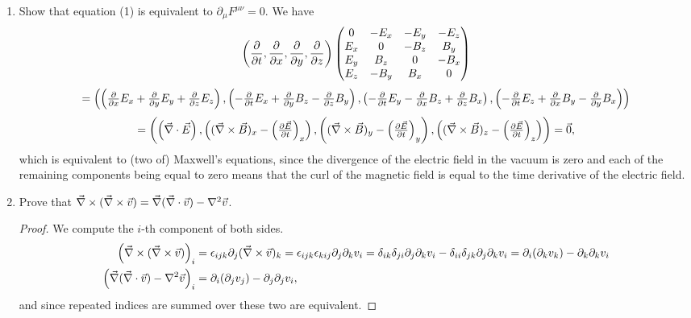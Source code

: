 \documentclass[11pt]{article}
\newcommand{\br}[1]{\left(#1\right)}
\begin{document}
\begin{enumerate}%
    \item Show that equation (1) is equivalent to $\partial_{\mu}F^{\mu\nu} = 0$. We have \[\br{\pdv{t},\pdv{x}, \pdv{y}, \pdv{z}}\begin{pmatrix}
      0 & -E_x & -E_y & -E_z \\
      E_x & 0 & -B_z & B_y \\
      E_y & B_z & 0 & -B_x \\
      E_z & -B_y & B_x & 0 
    \end{pmatrix}\]
    \[ = \begin{pmatrix}
      \br{\pdv{x}E_x + \pdv{y}E_y + \pdv{z}E_z} ,
      \br{-\pdv{t}E_x + \pdv{y}B_z - \pdv{z}B_y} ,
      \br{-\pdv{t}E_y - \pdv{x}B_z + \pdv{z}B_x} ,
      \br{-\pdv{t}E_z + \pdv{x}B_y - \pdv{y}B_x} 
    \end{pmatrix}\]
    \[= \begin{pmatrix}
      \br{\vec{\nabla}\cdot\vec{E}} ,
      \br{(\vec{\nabla}\times\vec{B})_x - \br{\pdv{\vec{E}}{t}}_x} ,
      \br{(\vec{\nabla}\times\vec{B})_y - \br{\pdv{\vec{E}}{t}}_y} ,
      \br{(\vec{\nabla}\times\vec{B})_z - \br{\pdv{\vec{E}}{t}}_z}
    \end{pmatrix} = \vec{0},\] which is equivalent to (two of) Maxwell's equations, since the divergence of the electric field in the vacuum is zero and each of the remaining components being equal to zero means that the curl of the magnetic field is equal to the time derivative of the electric field.
    \item Prove that $\vec{\nabla}\times (\vec{\nabla}\times \vec{v}) = \vec{\nabla}(\vec{\nabla}\cdot \vec{v}) - \laplacian\vec{v}$. \begin{proof}
      We compute the $i$-th component of both sides. \begin{align*}
        \br{\vec{\nabla}\times (\vec{\nabla}\times \vec{v})}_i &= \epsilon_{ijk}\partial_j(\vec{\nabla}\times \vec{v})_k = \epsilon_{ijk}\epsilon_{kij}\partial_j\partial_kv_i = \delta_{ik}\delta_{ji}\partial_j\partial_kv_i - \delta_{ii}\delta_{jk}\partial_j\partial_kv_i = \partial_i(\partial_kv_k)-\partial_k\partial_kv_i\\
        \br{\vec{\nabla}(\vec{\nabla}\cdot \vec{v}) - \laplacian\vec{v}}_i &= \partial_i(\partial_jv_j) - \partial_j\partial_jv_i,
      \end{align*} and since repeated indices are summed over these two are equivalent.
    \end{proof}
\end{enumerate}
\end{document}
